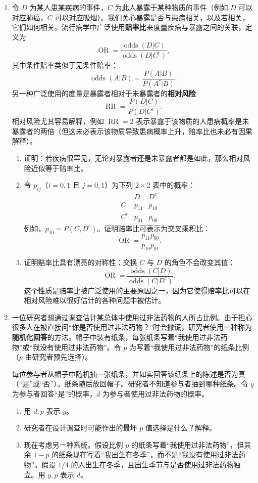 \documentclass[UTF8, 12pt, fontset=fandol, oneside]{ctexart}
\begin{document}
\begin{enumerate}
  \item 令 $D$ 为某人患某疾病的事件，$C$ 为此人暴露于某种物质的事件（例如 $D$ 可以对应肺癌，$C$ 可以对应吸烟）。我们关心暴露是否与患病相关，以及若相关，它们如何相关。流行病学中广泛使用\textbf{赔率比}来度量疾病与暴露之间的关联，定义为
  \[
    \operatorname{OR}=\frac{\operatorname{odds}(D|C)}
                           {\operatorname{odds}(D|C^c)},
  \]
  其中条件赔率类似于无条件赔率：
  \[
    \operatorname{odds}(A|B)=\frac{P(A|B)}{P(A^c|B)}.
  \]
  另一种广泛使用的度量是暴露者相对于未暴露者的\textbf{相对风险}
  \[
    \operatorname{RR}=\frac{P(D|C)}{P(D|C^c)}.
  \]
  相对风险尤其容易解释，例如 $\operatorname{RR}=2$ 表示暴露于该物质的人患病概率是未暴露者的两倍（但这未必表示该物质导致患病概率上升，赔率比也未必有因果解释）。
  \begin{enumerate}
    \item 证明：若疾病很罕见，无论对暴露者还是未暴露者都是如此，那么相对风险近似等于赔率比。
    \item 令 $p_{ij}$（$i=0,1$ 且 $j=0,1$）为下列 $2\times 2$ 表中的概率：
    \[
    \begin{array}{c|cc}
      & D & D^c\\
      \hline
      C & p_{11} & p_{10}\\
      C^c & p_{01} & p_{00}
    \end{array}
    \]
    例如，$p_{10}=P(C,D^c)$。证明赔率比可表示为交叉乘积比：
    \[
      \operatorname{OR}=\frac{p_{11}p_{00}}{p_{10}p_{01}}.
    \]
    \item 证明赔率比具有漂亮的对称性：交换 $C$ 与 $D$ 的角色不会改变其值：
    \[
      \operatorname{OR}=\frac{\operatorname{odds}(C|D)}
                              {\operatorname{odds}(C|D^c)}.
    \]
    这个性质是赔率比被广泛使用的主要原因之一，因为它使得赔率比可以在相对风险难以很好估计的各种问题中被估计。
  \end{enumerate}

  \item 一位研究者想通过调查估计某总体中使用过非法药物的人所占比例。由于担心很多人在被直接问“你是否使用过非法药物？”时会撒谎，研究者使用一种称为\textbf{随机化回答}的方法。帽子中装有纸条，每张纸条写着“我使用过非法药物”或“我没有使用过非法药物”。令 $p$ 为写着“我使用过非法药物”的纸条比例（$p$ 由研究者预先选择）。

  每位参与者从帽子中随机抽一张纸条，并如实回答该纸条上的陈述是否为真（“是”或“否”）。纸条随后放回帽子。研究者不知道参与者抽到哪种纸条。令 $y$ 为参与者回答“是”的概率，$d$ 为参与者使用过非法药物的概率。
  \begin{enumerate}
    \item 用 $d,p$ 表示 $y$。
    \item 研究者在设计调查时可能作出的最坏 $p$ 值选择是什么？解释。
    \item 现在考虑另一种系统。假设比例 $p$ 的纸条写着“我使用过非法药物”，但其余 $1-p$ 的纸条现在写着“我出生在冬季”，而不是“我没有使用过非法药物”。假设 $1/4$ 的人出生在冬季，且出生季节与是否使用过非法药物独立。用 $y,p$ 表示 $d$。
  \end{enumerate}


\end{enumerate}
\end{document}
